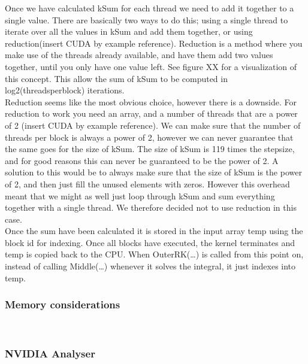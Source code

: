 Once we have calculated kSum for each thread we need to add it together to a single value. There are basically two ways to do this; using a single thread to iterate over all the values in kSum and add them together, or using reduction(insert CUDA by example reference). Reduction is a method where you make use of the threads already available, and have them add two values together, until you only have one value left. See figure XX for a visualization of this concept. This allow the sum of kSum to be computed in log2(threadsperblock) iterations.\\

Reduction seems like the most obvious choice, however there is a downside. For reduction to work you need an array, and a number of threads that are a power of 2 (insert CUDA by example reference). We can make sure that the number of threads per block is always a power of 2, however we can never guarantee that the same goes for the size of kSum. The size of kSum is 119 times the stepsize, and for good reasons this can never be guaranteed to be the power of 2. A solution to this would be to always make sure that the size of kSum is the power of 2, and then just fill the unused elements with zeros. However this overhead meant that we might as well just loop through kSum and sum everything together with a single thread. We therefore decided not to use reduction in this case.\\

Once the sum have been calculated it is stored in the input array temp using the block id for indexing. Once all blocks have executed, the kernel terminates and temp is copied back to the CPU. When OuterRK(…) is called from this point on, instead of calling Middle(…) whenever it solves the integral, it just indexes into temp.\\

\subsubsection{Memory considerations} \hfill \\

\subsubsection{NVIDIA Analyser} \hfill \\